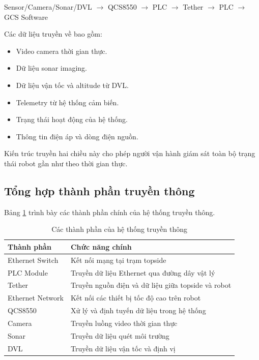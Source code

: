 \documentclass[../DoAn.tex]{subfiles}
\begin{document}
\begin{center}
Sensor/Camera/Sonar/DVL $\rightarrow$ QCS8550 $\rightarrow$ PLC $\rightarrow$ Tether $\rightarrow$ PLC $\rightarrow$ GCS Software
\end{center}

Các dữ liệu truyền về bao gồm:

\begin{itemize}
    \item Video camera thời gian thực.
    \item Dữ liệu sonar imaging.
    \item Dữ liệu vận tốc và altitude từ DVL.
    \item Telemetry từ hệ thống cảm biến.
    \item Trạng thái hoạt động của hệ thống.
    \item Thông tin điện áp và dòng điện nguồn.
\end{itemize}

Kiến trúc truyền hai chiều này cho phép người vận hành giám sát toàn bộ trạng thái robot gần như theo thời gian thực.

\subsection{Tổng hợp thành phần truyền thông}

Bảng \ref{tab:communication_system} trình bày các thành phần chính của hệ thống truyền thông.

\begin{table}[H]
\centering
\caption{Các thành phần của hệ thống truyền thông}
\label{tab:communication_system}
\begin{tabular}{|p{4cm}|p{9cm}|}
\hline
\textbf{Thành phần} & \textbf{Chức năng chính} \\ \hline

Ethernet Switch &
Kết nối mạng tại trạm topside \\ \hline

PLC Module &
Truyền dữ liệu Ethernet qua đường dây vật lý \\ \hline

Tether &
Truyền nguồn điện và dữ liệu giữa topside và robot \\ \hline

Ethernet Network &
Kết nối các thiết bị tốc độ cao trên robot \\ \hline

QCS8550 &
Xử lý và định tuyến dữ liệu trong hệ thống \\ \hline

Camera &
Truyền luồng video thời gian thực \\ \hline

Sonar &
Truyền dữ liệu quét môi trường \\ \hline

DVL &
Truyền dữ liệu vận tốc và định vị \\ \hline

\end{tabular}
\end{table}
\end{document}
